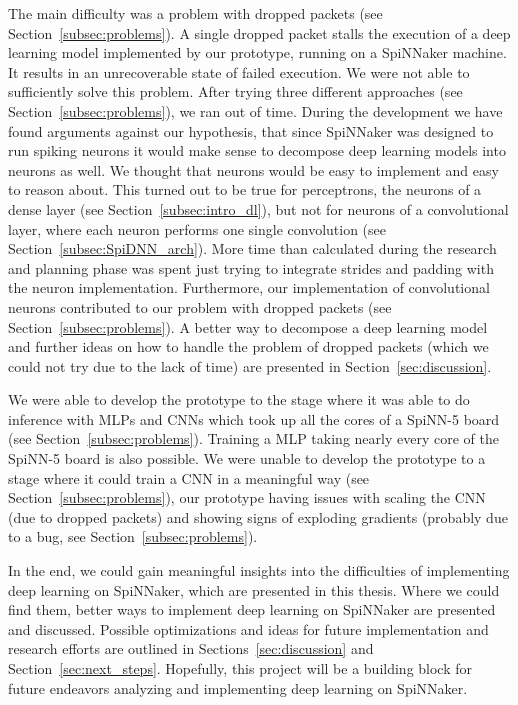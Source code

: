 \documentclass[]{article}
\begin{document}
The main difficulty was a problem with dropped packets (see
Section~\ref{subsec:problems}).
A single dropped packet stalls the execution of a deep learning model
implemented by our prototype, running on a SpiNNaker machine.
It results in an unrecoverable state of failed execution.
We were not able to sufficiently solve this problem.
After trying three different approaches (see
Section~\ref{subsec:problems}), we ran out of time.
During the development we have found arguments against our hypothesis,
that since SpiNNaker was designed to run spiking neurons it would make
sense to decompose deep learning models into neurons as well.
We thought that neurons would be easy to implement and easy to reason
about.
This turned out to be true for perceptrons, the neurons of a dense
layer (see Section~\ref{subsec:intro_dl}), but not for neurons of
a convolutional layer, where each neuron performs one single
convolution (see Section~\ref{subsec:SpiDNN_arch}).
More time than calculated during the research and planning phase was
spent just trying to integrate strides and padding with the neuron
implementation.
Furthermore, our implementation of convolutional neurons contributed
to our problem with dropped packets (see
Section~\ref{subsec:problems}).
A better way to decompose a deep learning model and further ideas on
how to handle the problem of dropped packets (which we could not try
due to the lack of time) are presented in
Section~\ref{sec:discussion}.

We were able to develop the prototype to the stage where it was able
to do inference with MLPs and CNNs which took up all the cores of a
SpiNN-5 board (see Section~\ref{subsec:problems}).
Training a MLP taking nearly every core of the SpiNN-5 board is also
possible.
We were unable to develop the prototype to a stage where it could
train a CNN in a meaningful way (see Section~\ref{subsec:problems}),
our prototype having issues with scaling the CNN (due to dropped
packets) and showing signs of exploding gradients (probably due to
a bug, see Section~\ref{subsec:problems}).

In the end, we could gain meaningful insights into the difficulties of
implementing deep learning on SpiNNaker, which are presented in this
thesis.
Where we could find them, better ways to implement deep learning on
SpiNNaker are presented and discussed.
Possible optimizations and ideas for future implementation and
research efforts are outlined in Sections~\ref{sec:discussion} and
Section~\ref{sec:next_steps}.
Hopefully, this project will be a building block for future endeavors
analyzing and implementing deep learning on SpiNNaker.
\end{document}
